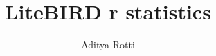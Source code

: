 \documentclass[11pt]{article}
\begin{document}
\title{LiteBIRD r statistics}
\author{Aditya Rotti}
\date{}
\maketitle


\newpage


%
%
\end{document}
